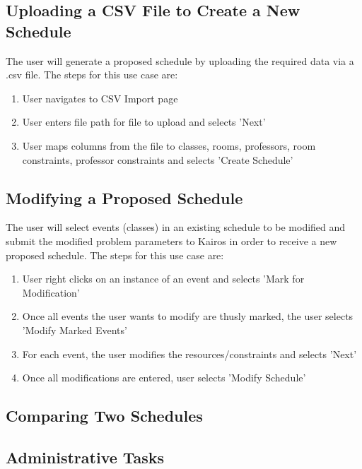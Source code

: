 \documentclass{extarticle}
\begin{document}
\subsection{Uploading a CSV File to Create a New Schedule}
The user will generate a proposed schedule by uploading the required data via a .csv file.  The steps
for this use case are:

\begin{enumerate}
\item User navigates to CSV Import page
\item User enters file path for file to upload and selects 'Next'
\item User maps columns from the file to classes, rooms, professors, room constraints, professor constraints and
selects 'Create Schedule'
\end{enumerate}


\subsection{Modifying a Proposed Schedule}
The user will select events (classes) in an existing schedule to be modified and submit the modified problem
parameters to Kairos in order to receive a new proposed schedule.  The steps for this use case are:

\begin{enumerate}
\item User right clicks on an instance of an event and selects 'Mark for Modification'
\item Once all events the user wants to modify are thusly marked, the user selects 'Modify Marked Events'
\item For each event, the user modifies the resources/constraints and selects 'Next'
\item Once all modifications are entered, user selects 'Modify Schedule'
\end{enumerate}


\subsection{Comparing Two Schedules}

\subsection{Administrative Tasks}
\end{document}
